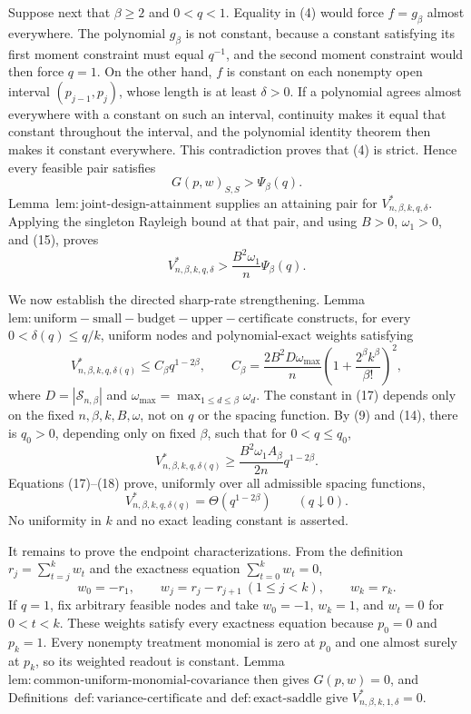 Suppose next that \(\beta\ge2\) and \(0<q<1\).  Equality in (4) would force \(f=g_\beta\) almost everywhere.  The polynomial \(g_\beta\) is not constant, because a constant satisfying its first moment constraint must equal \(q^{-1}\), and the second moment constraint would then force \(q=1\).  On the other hand, \(f\) is constant on each nonempty open interval \((p_{j-1},p_j)\), whose length is at least \(\delta>0\).  If a polynomial agrees almost everywhere with a constant on such an interval, continuity makes it equal that constant throughout the interval, and the polynomial identity theorem then makes it constant everywhere.  This contradiction proves that (4) is strict.  Hence every feasible pair satisfies
\[
G(p,w)_{S,S}>\Psi_\beta(q).
\tag{15}
\]
Lemma~\(\mathrm{lem{:}joint\text{-}design\text{-}attainment}\) supplies an attaining pair for \(V^*_{n,\beta,k,q,\delta}\).  Applying the singleton Rayleigh bound at that pair, and using \(B>0\), \(\omega_1>0\), and (15), proves
\[
V^*_{n,\beta,k,q,\delta}>
\frac{B^2\omega_1}{n}\Psi_\beta(q).
\tag{16}
\]

We now establish the directed sharp-rate strengthening.  Lemma~\(\mathrm{lem{:}uniform-small-budget-upper-certificate}\) constructs, for every \(0<\delta(q)\le q/k\), uniform nodes and polynomial-exact weights satisfying
\[
V^*_{n,\beta,k,q,\delta(q)}
\le C_\beta q^{1-2\beta},
\qquad
C_\beta=\frac{2B^2D\omega_{\max}}{n}
\left(1+\frac{2^\beta k^\beta}{\beta!}\right)^2,
\tag{17}
\]
where \(D=|\mathcal S_{n,\beta}|\) and \(\omega_{\max}=\max_{1\le d\le\beta}\omega_d\).  The constant in (17) depends only on the fixed \(n,\beta,k,B,\omega\), not on \(q\) or the spacing function.  By (9) and (14), there is \(q_0>0\), depending only on fixed \(\beta\), such that for \(0<q\le q_0\),
\[
V^*_{n,\beta,k,q,\delta(q)}
\ge \frac{B^2\omega_1A_\beta}{2n}q^{1-2\beta}.
\tag{18}
\]
Equations (17)--(18) prove, uniformly over all admissible spacing functions,
\[
V^*_{n,\beta,k,q,\delta(q)}=\Theta(q^{1-2\beta})
\qquad(q\downarrow0).
\tag{19}
\]
No uniformity in \(k\) and no exact leading constant is asserted.

It remains to prove the endpoint characterizations.  From the definition \(r_j=\sum_{t=j}^kw_t\) and the exactness equation \(\sum_{t=0}^kw_t=0\),
\[
w_0=-r_1,
\qquad w_j=r_j-r_{j+1}\ (1\le j<k),
\qquad w_k=r_k.
\tag{20}
\]
If \(q=1\), fix arbitrary feasible nodes and take \(w_0=-1\), \(w_k=1\), and \(w_t=0\) for \(0<t<k\).  These weights satisfy every exactness equation because \(p_0=0\) and \(p_k=1\).  Every nonempty treatment monomial is zero at \(p_0\) and one almost surely at \(p_k\), so its weighted readout is constant.  Lemma~\(\mathrm{lem{:}common\text{-}uniform\text{-}monomial\text{-}covariance}\) then gives \(G(p,w)=0\), and Definitions~\(\mathrm{def{:}variance\text{-}certificate}\) and \(\mathrm{def{:}exact\text{-}saddle}\) give \(V^*_{n,\beta,k,1,\delta}=0\).

